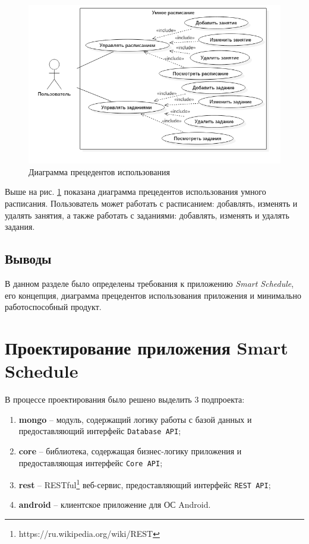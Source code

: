 \begin{figure}[H]
	\begin{center}
		\includegraphics[scale=0.7]{pics/usecase}
		\caption{Диаграмма прецедентов использования} 
		\label{pic:use_case_diagram} %
	\end{center}
\end{figure}

Выше на рис. \ref{pic:use_case_diagram} показана диаграмма прецедентов использования умного расписания. Пользователь может работать с расписанием: добавлять, изменять и удалять занятия, а также работать с заданиями: добавлять, изменять и удалять задания.

\subsection{Выводы}

В данном разделе было определены требования к приложению \textit{Smart Schedule}, его концепция, диаграмма прецедентов использования приложения и минимально работоспособный продукт.

\section{Проектирование приложения Smart Schedule}

В процессе проектирования было решено выделить 3 подпроекта:
\begin{enumerate}
\item \textbf{mongo} -- модуль, содержащий логику работы с базой данных и предоставляющий интерфейс \texttt{Database API};
\item \textbf{core} -- библиотека, содержащая бизнес-логику приложения и предоставляющая интерфейс \texttt{Core API};
\item \textbf{rest} -- RESTful\footnote{https://ru.wikipedia.org/wiki/REST} веб-сервис, предоставляющий интерфейс \texttt{REST API};
\item \textbf{android} -- клиентское приложение для ОС Android.
\end{enumerate}


